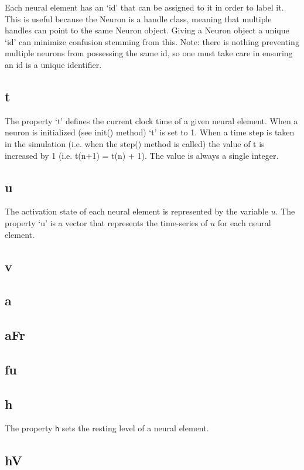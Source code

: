 \documentclass[phd, 12pt, doublespace, online]{fauthesis}
\begin{document}
Each neural element has an `id' that can be assigned to it in order to label it. This is useful because the Neuron is a handle class, meaning that multiple handles can point to the same Neuron object. Giving a Neuron object a unique `id' can minimize confusion stemming from this. Note: there is nothing preventing multiple neurons from possessing the same id, so one must take care in ensuring an id is a unique identifier. 

\subsection{t}

The property `t' defines the current clock time of a given neural element. When a neuron is initialized (see init() method) `t' is set to 1. When a time step is taken in the simulation (i.e. when the step() method is called) the value of t is increased by 1 (i.e. t(n+1) = t(n) + 1). The value is always a single integer. 

\subsection{u}

The activation state of each neural element is represented by the variable $u$. The property `u' is a vector that represents the time-series of $u$ for each neural element. 

\subsection{v}
\subsection{a}
\subsection{aFr}
\subsection{fu}
\subsection{h}

The property {\tt h} sets the resting level of a neural element. 

\subsection{hV}
\end{document}
